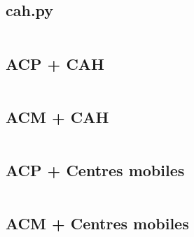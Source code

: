 \documentclass{rapportECL}
\begin{document}
\subsection{cah.py}
\inputminted[linenos=True]{python}{scr/cah.py}

\subsection{ACP + CAH}
\inputminted[linenos=True]{python}{scr/mixte_acp_cah.py}

\subsection{ACM + CAH}
\inputminted[linenos=True]{python}{scr/mixte_acm_cah.py}

\subsection{ACP + Centres mobiles}
\inputminted[linenos=True]{python}{scr/ACP-CM.py}

\subsection{ACM + Centres mobiles}
\inputminted[linenos=True]{python}{scr/ACM-CM.py}

\newpage

\end{document}
